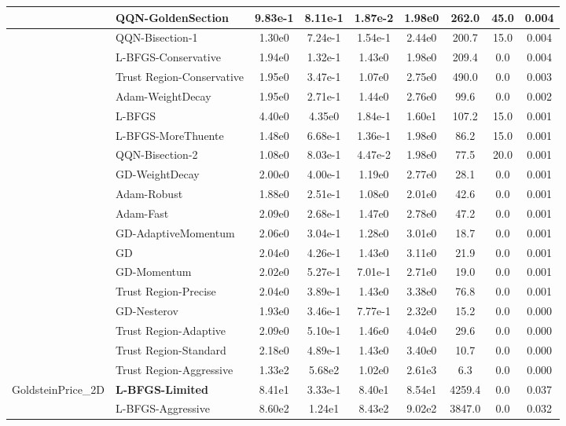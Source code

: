 \documentclass[10pt]{article}
\begin{document}
\begin{longtable}{|l|l|c|c|c|c|c|c|c|}
\hline
 & QQN-GoldenSection & 9.83e-1 & 8.11e-1 & 1.87e-2 & 1.98e0 & 262.0 & 45.0 & 0.004 \\
\hline
 & QQN-Bisection-1 & 1.30e0 & 7.24e-1 & 1.54e-1 & 2.44e0 & 200.7 & 15.0 & 0.004 \\
\hline
 & L-BFGS-Conservative & 1.94e0 & 1.32e-1 & 1.43e0 & 1.98e0 & 209.4 & 0.0 & 0.004 \\
\hline
 & Trust Region-Conservative & 1.95e0 & 3.47e-1 & 1.07e0 & 2.75e0 & 490.0 & 0.0 & 0.003 \\
\hline
 & Adam-WeightDecay & 1.95e0 & 2.71e-1 & 1.44e0 & 2.76e0 & 99.6 & 0.0 & 0.002 \\
\hline
 & L-BFGS & 4.40e0 & 4.35e0 & 1.84e-1 & 1.60e1 & 107.2 & 15.0 & 0.001 \\
\hline
 & L-BFGS-MoreThuente & 1.48e0 & 6.68e-1 & 1.36e-1 & 1.98e0 & 86.2 & 15.0 & 0.001 \\
\hline
 & QQN-Bisection-2 & 1.08e0 & 8.03e-1 & 4.47e-2 & 1.98e0 & 77.5 & 20.0 & 0.001 \\
\hline
 & GD-WeightDecay & 2.00e0 & 4.00e-1 & 1.19e0 & 2.77e0 & 28.1 & 0.0 & 0.001 \\
\hline
 & Adam-Robust & 1.88e0 & 2.51e-1 & 1.08e0 & 2.01e0 & 42.6 & 0.0 & 0.001 \\
\hline
 & Adam-Fast & 2.09e0 & 2.68e-1 & 1.47e0 & 2.78e0 & 47.2 & 0.0 & 0.001 \\
\hline
 & GD-AdaptiveMomentum & 2.06e0 & 3.04e-1 & 1.28e0 & 3.01e0 & 18.7 & 0.0 & 0.001 \\
\hline
 & GD & 2.04e0 & 4.26e-1 & 1.43e0 & 3.11e0 & 21.9 & 0.0 & 0.001 \\
\hline
 & GD-Momentum & 2.02e0 & 5.27e-1 & 7.01e-1 & 2.71e0 & 19.0 & 0.0 & 0.001 \\
\hline
 & Trust Region-Precise & 2.04e0 & 3.89e-1 & 1.43e0 & 3.38e0 & 76.8 & 0.0 & 0.001 \\
\hline
 & GD-Nesterov & 1.93e0 & 3.46e-1 & 7.77e-1 & 2.32e0 & 15.2 & 0.0 & 0.000 \\
\hline
 & Trust Region-Adaptive & 2.09e0 & 5.10e-1 & 1.46e0 & 4.04e0 & 29.6 & 0.0 & 0.000 \\
\hline
 & Trust Region-Standard & 2.18e0 & 4.89e-1 & 1.43e0 & 3.40e0 & 10.7 & 0.0 & 0.000 \\
\hline
 & Trust Region-Aggressive & 1.33e2 & 5.68e2 & 1.02e0 & 2.61e3 & 6.3 & 0.0 & 0.000 \\
GoldsteinPrice\_2D & \textbf{L-BFGS-Limited} & 8.41e1 & 3.33e-1 & 8.40e1 & 8.54e1 & 4259.4 & 0.0 & 0.037 \\
\hline
 & L-BFGS-Aggressive & 8.60e2 & 1.24e1 & 8.43e2 & 9.02e2 & 3847.0 & 0.0 & 0.032 \\

\end{longtable}
\end{document}
